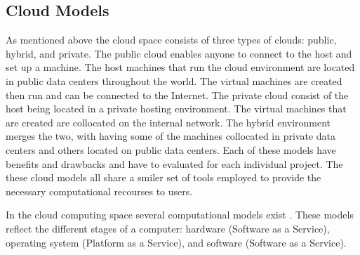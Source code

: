 \documentclass[12pt]{article}
\begin{document}
\subsection{Cloud Models}
As mentioned above the cloud space consists of three types of clouds: public, hybrid, and private. The public cloud enables anyone to connect to the host and set up a machine. The host machines that run the cloud environment are located in public data centers throughout the world. The virtual machines are created then run and can be connected to the Internet.  The private cloud consist of the host being located in a private hosting environment. The virtual machines that are created are collocated on the internal network. The hybrid environment merges the two, with having some of the machines collocated in private data centers and others located on public data centers. Each of these models have benefits and drawbacks and have to evaluated for each individual project. The these cloud models all share a smiler set of tools employed to provide the necessary computational recourses to users.

In the cloud computing space several computational models exist \cite{wikipedia}. These models reflect the different stages of a computer: hardware (Software as a Service), operating system (Platform as a Service), and software (Software as a Service).
\end{document}
